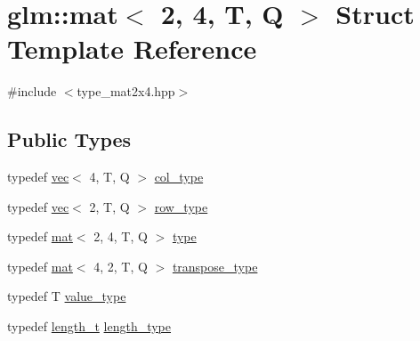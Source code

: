 \hypertarget{structglm_1_1mat_3_012_00_014_00_01_t_00_01_q_01_4}{}\section{glm\+:\+:mat$<$ 2, 4, T, Q $>$ Struct Template Reference}
\label{structglm_1_1mat_3_012_00_014_00_01_t_00_01_q_01_4}


{\ttfamily \#include $<$type\+\_\+mat2x4.\+hpp$>$}

\subsection*{Public Types}
\begin{DoxyCompactItemize}
\item 
typedef \mbox{\hyperlink{structglm_1_1vec}{vec}}$<$ 4, T, Q $>$ \mbox{\hyperlink{structglm_1_1mat_3_012_00_014_00_01_t_00_01_q_01_4_ae14ad10a9d8ce3908ec89ae373a27872}{col\+\_\+type}}
\item 
typedef \mbox{\hyperlink{structglm_1_1vec}{vec}}$<$ 2, T, Q $>$ \mbox{\hyperlink{structglm_1_1mat_3_012_00_014_00_01_t_00_01_q_01_4_af7681d37f1454b1e18754262a65eb6d1}{row\+\_\+type}}
\item 
typedef \mbox{\hyperlink{structglm_1_1mat}{mat}}$<$ 2, 4, T, Q $>$ \mbox{\hyperlink{structglm_1_1mat_3_012_00_014_00_01_t_00_01_q_01_4_a04c04d7f08549f03063d04bca3a76ae5}{type}}
\item 
typedef \mbox{\hyperlink{structglm_1_1mat}{mat}}$<$ 4, 2, T, Q $>$ \mbox{\hyperlink{structglm_1_1mat_3_012_00_014_00_01_t_00_01_q_01_4_a5030a7f34454a6871ed17c1b27cc0929}{transpose\+\_\+type}}
\item 
typedef T \mbox{\hyperlink{structglm_1_1mat_3_012_00_014_00_01_t_00_01_q_01_4_a837bd82ca90340b03c7ee19f598c5133}{value\+\_\+type}}
\item 
typedef \mbox{\hyperlink{namespaceglm_a090a0de2260835bee80e71a702492ed9}{length\+\_\+t}} \mbox{\hyperlink{structglm_1_1mat_3_012_00_014_00_01_t_00_01_q_01_4_a5295c484627e965d615f3367c2ca45d8}{length\+\_\+type}}
\end{DoxyCompactItemize}
